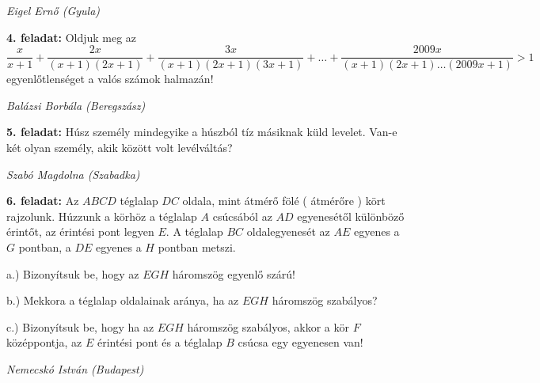 \documentclass[a4paper,10pt]{article}
\def\ki#1#2{\hfill {\it #1 (#2)}\medskip}
\begin{document}
\ki{Eigel Ernő}{Gyula}\medskip

{\bf 4. feladat: }
Oldjuk meg az
$$ \frac {x}{x+1}+\frac{2x}{(x+1)(2x+1)}+\frac{3x}{(x+1)(2x+1)(3x+1)}+\dots+\frac{2009x}{(x+1)(2x+1)\dots(2009x+1)}>1$$
egyenlőtlenséget a valós számok halmazán!

\ki{Balázsi Borbála}{Beregszász}\medskip

{\bf 5. feladat: }
Húsz személy mindegyike a húszból tíz másiknak küld levelet. Van-e két
olyan személy, akik között volt levélváltás?
 
\ki{Szabó Magdolna}{Szabadka}\medskip

{\bf 6. feladat: } 
Az $ABCD$ téglalap $DC$ oldala, mint átmérő fölé ( átmérőre ) kört rajzolunk.
Húzzunk a körhöz a téglalap $A$ csúcsából az $AD$ egyenesétől különböző érintőt, az érintési
pont legyen $E$. A téglalap $BC$ oldalegyenesét az $AE$ egyenes a $G$ pontban, a $DE$ egyenes a $H$
pontban metszi.

a.) Bizonyítsuk be, hogy az $EGH$ háromszög egyenlő szárú!

b.) Mekkora a téglalap oldalainak aránya, ha az $EGH$ háromszög szabályos?

c.) Bizonyítsuk be, hogy ha az $EGH$ háromszög szabályos, akkor a kör $F$ középpontja, az $E$
érintési pont és a téglalap $B$ csúcsa egy egyenesen van!


\ki{Nemecskó István}{Budapest}\medskip

\vfill
\end{document}

